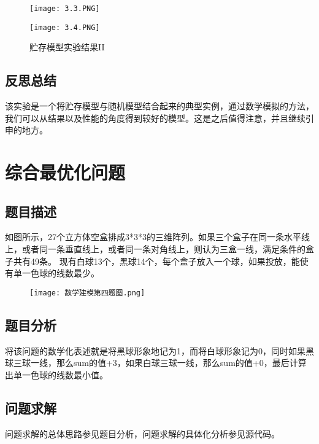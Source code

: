 \documentclass[UTF8]{ctexart}
\begin{document}
	\begin{figure}
	\centering
	\begin{minipage}[c]{0.5\textwidth}
	\centering
	\texttt{[image: 3.3.PNG]}
	\end{minipage}%
	\begin{minipage}[c]{0.5\textwidth}
	\centering
	\texttt{[image: 3.4.PNG]}
	\end{minipage}
	\caption{贮存模型实验结果II}
	\end{figure}

    \subsection{反思总结}
    该实验是一个将贮存模型与随机模型结合起来的典型实例，通过数学模拟的方法，我们可以从结果以及性能的角度得到较好的模型。这是之后值得注意，并且继续引申的地方。

    \section{综合最优化问题}
    \subsection{题目描述}
    如图所示，27个立方体空盒排成3*3*3的三维阵列。如果三个盒子在同一条水平线上，或者同一条垂直线上，或者同一条对角线上，则认为三盒一线，满足条件的盒子共有49条。
    现有白球13个，黑球14个，每个盒子放入一个球，如果投放，能使有单一色球的线数最少。

    \begin{figure}[!htb]
	\centering
	\texttt{[image: 数学建模第四题图.png]}
	\end{figure}

    \subsection{题目分析}
    将该问题的数学化表述就是将黑球形象地记为1，而将白球形象记为0，同时如果黑球三球一线，那么sum的值+3，如果白球三球一线，那么sum的值+0，最后计算出单一色球的线数最小值。

    \subsection{问题求解}
    问题求解的总体思路参见题目分析，问题求解的具体化分析参见源代码。
\end{document}
